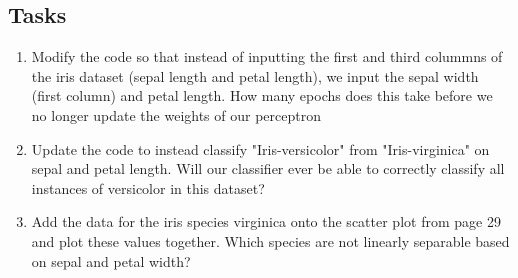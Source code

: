 \documentclass[12pt]{article}
\begin{document}
\subsection{Tasks}
\begin{enumerate}
\item Modify the code so that instead of inputting the first and third colummns of the iris dataset (sepal length and petal length), we input the sepal width (first column) and petal length. How many epochs does this take before we no longer update the weights of our perceptron 
\item Update the code to instead classify "Iris-versicolor" from "Iris-virginica" on sepal and petal length. Will our classifier ever be able to correctly classify all instances of versicolor in this dataset? 


\item Add the data for the iris species virginica onto the scatter plot from page 29 and plot these values together. Which species are not linearly  separable based on sepal and petal width?

\end{enumerate}
\end{document}
